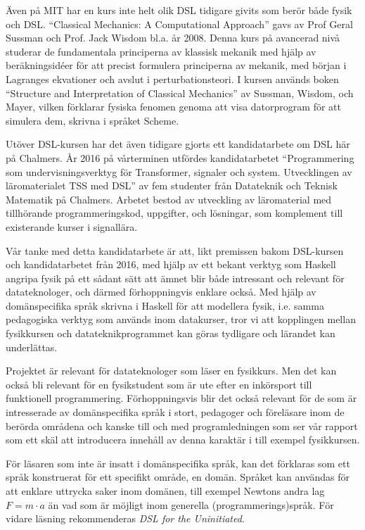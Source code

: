 \documentclass[12pt,a4paper]{article}
\begin{document}
Även på MIT har en kurs inte helt olik DSL tidigare givits som berör både fysik
och DSL. ``Classical Mechanics: A Computational Approach'' gavs av
Prof Geral Sussman och Prof. Jack Wisdom bl.a. år
2008.\cite{classical-mechanics-course-mit-2008}
Denna kurs på avancerad nivå studerar de fundamentala principerna av klassisk mekanik
med hjälp av beräkningsidéer för att precist formulera principerna av
mekanik, med början i Lagranges ekvationer och avslut i
perturbationsteori. I kursen används boken ``Structure and
Interpretation of Classical Mechanics'' av Sussman, Wisdom, och Mayer,
vilken förklarar fysiska fenomen genoma att visa datorprogram för att
simulera dem, skrivna i språket Scheme.\cite{SICM}

Utöver DSL-kursen har det även tidigare gjorts ett kandidatarbete om DSL
här på Chalmers. År 2016 på vårterminen utfördes kandidatarbetet
``Programmering som undervisningsverktyg för Transformer, signaler och
system. Utvecklingen av läromaterialet TSS med DSL'' av fem studenter
från Datateknik och Teknisk Matematik på Chalmers. Arbetet bestod av
utveckling av läromaterial med tillhörande programmeringskod,
uppgifter, och lösningar, som komplement till existerande kurser i
signallära.\cite{kandidat2016}

Vår tanke med detta kandidatarbete är att, likt premissen bakom DSL-kursen 
och kandidatarbetet från 2016, med hjälp av ett bekant verktyg
som Haskell angripa fysik på ett sådant sätt att ämnet blir både
intressant och relevant för datateknologer, och därmed förhoppningvis
enklare också. Med hjälp av domänspecifika språk skrivna i Haskell för att
modellera fysik, i.e. samma pedagogiska verktyg som används inom
datakurser, tror vi att kopplingen mellan fysikkursen och
datateknikprogrammet kan göras tydligare och lärandet kan underlättas.

Projektet är relevant för datateknologer som läser en fysikkurs. Men
det kan också bli relevant för en fysikstudent som är ute efter en
inkörsport till funktionell programmering. Förhoppningsvis blir det
också relevant för de som är intresserade av domänspecifika språk i
stort, pedagoger och föreläsare inom de berörda områdena och kanske
till och med programledningen som ser vår rapport som ett skäl att
introducera innehåll av denna karaktär i till exempel fysikkursen.

För läsaren som inte är insatt i domänspecifika språk, kan det
förklaras som ett språk konstruerat för ett specifikt område, en
domän. Språket kan användas för att enklare uttrycka saker inom
domänen, till exempel Newtons andra lag $F=m \cdot a$ än vad som är
möjligt inom generella (programmerings)språk. För vidare läsning
rekommenderas \textit{DSL for the Uninitiated}.\cite{DSLU}
\end{document}
